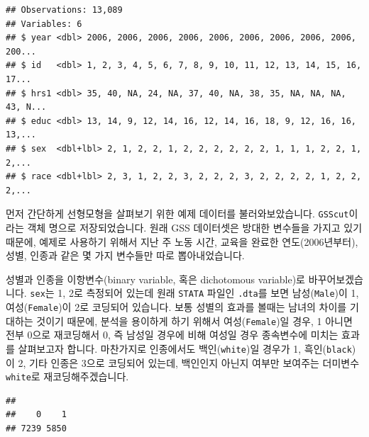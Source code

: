 \documentclass[]{book}
\newenvironment{Shaded}{\begin{snugshade}}{\end{snugshade}}
\newcommand{\DecValTok}[1]{\textcolor[rgb]{0.00,0.00,0.81}{#1}}
\newcommand{\KeywordTok}[1]{\textcolor[rgb]{0.13,0.29,0.53}{\textbf{#1}}}
\newcommand{\NormalTok}[1]{#1}
\newcommand{\OperatorTok}[1]{\textcolor[rgb]{0.81,0.36,0.00}{\textbf{#1}}}
\newcommand{\StringTok}[1]{\textcolor[rgb]{0.31,0.60,0.02}{#1}}
\begin{document}
\begin{verbatim}
## Observations: 13,089
## Variables: 6
## $ year <dbl> 2006, 2006, 2006, 2006, 2006, 2006, 2006, 2006, 2006, 200...
## $ id   <dbl> 1, 2, 3, 4, 5, 6, 7, 8, 9, 10, 11, 12, 13, 14, 15, 16, 17...
## $ hrs1 <dbl> 35, 40, NA, 24, NA, 37, 40, NA, 38, 35, NA, NA, NA, 43, N...
## $ educ <dbl> 13, 14, 9, 12, 14, 16, 12, 14, 16, 18, 9, 12, 16, 16, 13,...
## $ sex  <dbl+lbl> 2, 1, 2, 2, 1, 2, 2, 2, 2, 2, 2, 1, 1, 1, 2, 2, 1, 2,...
## $ race <dbl+lbl> 2, 3, 1, 2, 2, 3, 2, 2, 2, 3, 2, 2, 2, 2, 1, 2, 2, 2,...
\end{verbatim}

먼저 간단하게 선형모형을 살펴보기 위한 예제 데이터를 불러와보았습니다. \texttt{GSScut}이라는 객체 명으로 저장되었습니다. 원래 GSS 데이터셋은 방대한 변수들을 가지고 있기 때문에, 예제로 사용하기 위해서 지난 주 노동 시간, 교육을 완료한 연도(2006년부터), 성별, 인종과 같은 몇 가지 변수들만 따로 뽑아내었습니다.

성별과 인종을 이항변수(binary variable, 혹은 dichotomous variable)로 바꾸어보겠습니다. \texttt{sex}는 1, 2로 측정되어 있는데 원래 \texttt{STATA} 파일인 \texttt{.dta}를 보면 남성(\texttt{Male})이 1, 여성(\texttt{Female})이 2로 코딩되어 있습니다. 보통 성별의 효과를 볼때는 남녀의 차이를 기대하는 것이기 때문에, 분석을 용이하게 하기 위해서 여성(\texttt{Female})일 경우, 1 아니면 전부 0으로 재코딩해서 0, 즉 남성일 경우에 비해 여성일 경우 종속변수에 미치는 효과를 살펴보고자 합니다. 마찬가지로 인종에서도 백인(\texttt{white})일 경우가 1, 흑인(\texttt{black})이 2, 기타 인종은 3으로 코딩되어 있는데, 백인인지 아닌지 여부만 보여주는 더미변수 \texttt{white}로 재코딩해주겠습니다.

\begin{Shaded}
\end{Shaded}

\begin{verbatim}
## 
##    0    1 
## 7239 5850
\end{verbatim}

\begin{Shaded}
\end{Shaded}
\end{document}
